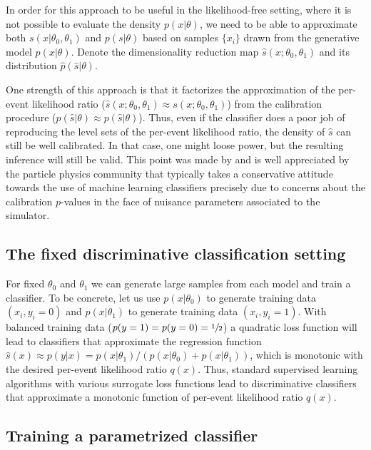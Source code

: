 \documentclass[12pt]{article}
\numberwithin{equation}{section}
\theoremstyle{plain}
\begin{document}
In order for this approach to be useful in the likelihood-free setting, where it
is not possible to evaluate the density $p(x|\theta)$, we need to be able to
approximate both $s(x|\theta_0, \theta_1)$ and $p(s|\theta)$ based on samples
$\{x_i\}$ drawn from the generative model $p(x|\theta)$.  Denote the
dimensionality reduction map $\hat{s}(x; \theta_0, \theta_1)$ and its
distribution $\hat{p}(\hat{s}|\theta)$.

One strength of this approach is that it factorizes the approximation of the
per-event likelihood ratio ($\hat{s}(x; \theta_0, \theta_1) \approx s(x;
\theta_0, \theta_1)$) from the calibration procedure ($\hat p(\hat s| \theta)
\approx p(\hat{s}|\theta)$). Thus, even if the classifier does a poor job of
reproducing the level sets of the per-event likelihood ratio, the density of
$\hat{s}$ can still be well calibrated. In that case, one might loose power, but
the resulting inference will still be valid. This point was made by
\cite{Neal:2007zz} and is well appreciated by the particle physics community
that typically takes a conservative attitude towards the use of machine learning
classifiers precisely due to concerns about the calibration $p$-values in the
face of nuisance parameters associated to the simulator.

\subsection{The fixed discriminative classification setting} For fixed
$\theta_0$ and $\theta_1$ we can generate large samples from each model and
train a classifier. To be concrete, let us use $p(x|\theta_0)$ to generate
training data $(x_i,  y_i=0)$ and $p(x|\theta_1)$ to generate training data
$(x_i , y_i=1)$. With balanced training data
\mbox{($p(y=1)=p(y=0)=\sfrac{1}{2}$)} a quadratic loss function will lead to
classifiers that approximate the regression function  $\hat{s}(x) \approx p(y|x) =
p(x|\theta_1)/(p(x|\theta_0)+p(x|\theta_1))$, which is  monotonic with the
desired per-event likelihood ratio $q(x)$. Thus, standard supervised learning
algorithms with various surrogate loss functions lead to discriminative
classifiers that approximate a monotonic function of per-event likelihood ratio
$q(x)$.


\subsection{Training a parametrized classifier}
\end{document}
